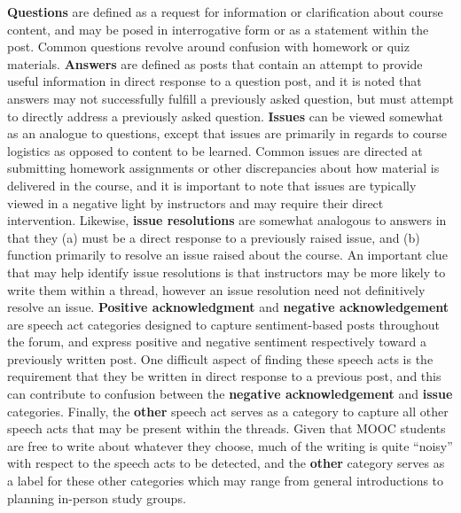 \documentclass[twoside]{article}
\begin{document}
\textbf{Questions} are defined as a request for information or clarification about course content, and may be posed in interrogative form or as a statement within the post. Common questions revolve around confusion with homework or quiz materials. \textbf{Answers} are defined as posts that contain an attempt to provide useful information in direct response to a question post, and it is noted that answers may not successfully fulfill a previously asked question, but must attempt to directly address a previously asked question. \textbf{Issues} can be viewed somewhat as an analogue to questions, except that issues are primarily in regards to course logistics as opposed to content to be learned. Common issues are directed at submitting homework assignments or other discrepancies about how material is delivered in the course, and it is important to note that issues are typically viewed in a negative light by instructors and may require their direct intervention. Likewise, \textbf{issue resolutions} are somewhat analogous to answers in that they (a) must be a direct response to a previously raised issue, and (b) function primarily to resolve an issue raised about the course. An important clue that may help identify issue resolutions is that instructors may be more likely to write them within a thread, however an issue resolution need not definitively resolve an issue. \textbf{Positive acknowledgment} and \textbf{negative acknowledgement} are speech act categories designed to capture sentiment-based posts throughout the forum, and express positive and negative sentiment respectively toward a previously written post. One difficult aspect of finding these speech acts is the requirement that they be written in direct response to a previous post, and this can contribute to confusion between the \textbf{negative acknowledgement} and \textbf{issue} categories. Finally, the \textbf{other} speech act serves as a category to capture all other speech acts that may be present within the threads. Given that MOOC students are free to write about whatever they choose, much of the writing is quite ``noisy'' with respect to the speech acts to be detected, and the \textbf{other} category serves as a label for these other categories which may range from general introductions to planning in-person study groups.
\end{document}
